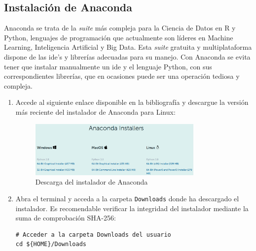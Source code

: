 \subsection{Instalación de Anaconda}
\label{subsec:instalacion-anaconda}

Anaconda se trata de la \textit{suite} más compleja para la Ciencia de Datos en R y Python, lenguajes de programación que actualmente son líderes en Machine Learning, Inteligencia Artificial y Big Data. Esta \textit{suite} gratuita y multiplataforma dispone de las \gls{ide}'s y librerías adecuadas para su manejo. Con Anaconda se evita tener que instalar manualmente un \gls{ide} y el lenguaje Python, con sus correspondientes librerías, que en ocasiones puede ser una operación tediosa y compleja.

\begin{enumerate}
    \item Accede al siguiente enlace \cite{inst-conda} disponible en la bibliografía y descargue la versión más reciente del instalador de Anaconda para Linux:
    
    \begin{figure}[ht]
    \centering
    \includegraphics[width=0.8\textwidth]{img/appendix/C/anaconda-installer.png}
    \caption{\label{fig:anaconda-download}Descarga del instalador de Anaconda \cite{inst-conda}}
    \end{figure}

    \item Abra el terminal y acceda a la carpeta \texttt{Downloads} donde ha descargado el instalador. Es recomendable verificar la integridad del instalador mediante la suma de comprobación SHA-256:
    
    \vspace{0.5cm}
    
    
\begin{lstlisting}[language=iPython,caption=Verificación de la integridad de la instalación de Anaconda,captionpos=b,label={lst:verificar-sha256}]
# Acceder a la carpeta Downloads del usuario
cd ${HOME}/Downloads


\end{lstlisting}
\end{enumerate}
